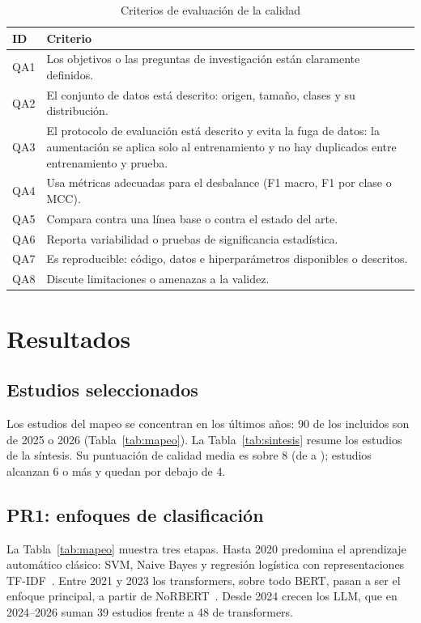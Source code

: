 \documentclass[conference]{IEEEtran}
\begin{document}
\begin{table}[!t]
\caption{Criterios de evaluación de la calidad}
\label{tab:calidad}
\centering\footnotesize
\begin{tabularx}{\columnwidth}{@{}p{0.65cm} Y@{}}
\toprule
\textbf{ID} & \textbf{Criterio} \\
\midrule
QA1 & Los objetivos o las preguntas de investigación están claramente definidos. \\
QA2 & El conjunto de datos está descrito: origen, tamaño, clases y su distribución. \\
QA3 & El protocolo de evaluación está descrito y evita la fuga de datos: la aumentación se aplica solo al entrenamiento y no hay duplicados entre entrenamiento y prueba. \\
QA4 & Usa métricas adecuadas para el desbalance (F1 macro, F1 por clase o MCC). \\
QA5 & Compara contra una línea base o contra el estado del arte. \\
QA6 & Reporta variabilidad o pruebas de significancia estadística. \\
QA7 & Es reproducible: código, datos e hiperparámetros disponibles o descritos. \\
QA8 & Discute limitaciones o amenazas a la validez. \\
\bottomrule
\end{tabularx}
\end{table}

\section{Resultados}\label{sec:resultados}
\subsection{Estudios seleccionados}
Los \nMapeo{} estudios del mapeo se concentran en los últimos años: 90 de los \nBuscados{} incluidos son de 2025 o 2026 (Tabla~\ref{tab:mapeo}). La Tabla~\ref{tab:sintesis} resume los \nSintesis{} estudios de la síntesis. Su puntuación de calidad media es \qMedia{} sobre 8 (de \qMin{} a \qMax); \nCalidadAlta{} estudios alcanzan 6 o más y \nCalidadBaja{} quedan por debajo de 4.

\tablaMapeo
\tablaSintesis

\subsection{PR1: enfoques de clasificación}\label{sec:pr1}
La Tabla~\ref{tab:mapeo} muestra tres etapas. Hasta 2020 predomina el aprendizaje automático clásico: SVM, Naive Bayes y regresión logística con representaciones TF-IDF~\cite{Kurtanovic2017-SupervisedML,Toth2018-Study}. Entre 2021 y 2023 los transformers, sobre todo BERT, pasan a ser el enfoque principal, a partir de NoRBERT~\cite{Hey2020-NoRBERT}. Desde 2024 crecen los LLM, que en 2024--2026 suman 39 estudios frente a 48 de transformers.
\end{document}
